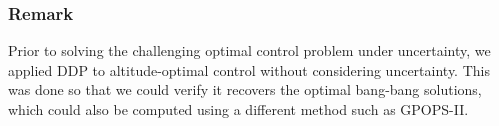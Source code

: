 \documentclass[journal ]{new-aiaa}
\begin{document}
\subsubsection*{Remark}
Prior to solving the challenging optimal control problem under uncertainty, we applied DDP to altitude-optimal control without considering uncertainty. This was done so that we could verify it recovers the optimal bang-bang solutions, which could also be computed using a different method such as GPOPS-II\cite{GPOPS2}.

\end{document}
